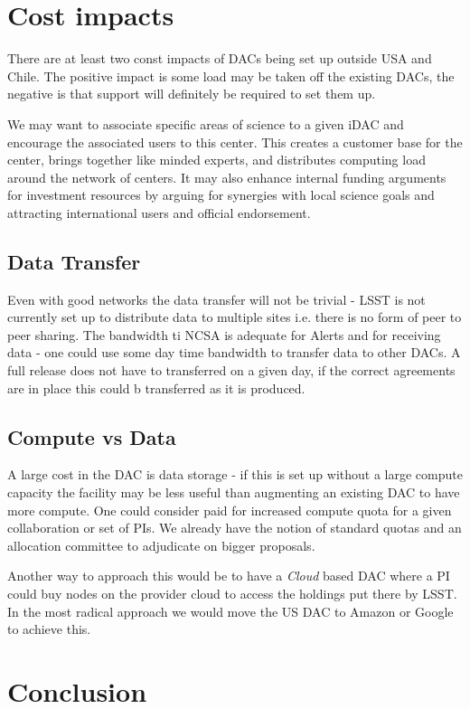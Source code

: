 \section{Cost impacts}
There are at least two const impacts of DACs being set up outside USA and Chile. The positive impact is some load may be taken off the existing DACs, the negative is that support will definitely be required to set them up.

We may want to associate specific areas of science to a given iDAC  and encourage the associated users to this center. This creates a customer base for the center, brings together like minded experts, and distributes computing load around the network of centers. It may also enhance internal funding arguments for investment resources by arguing for synergies with local science goals and attracting international users and official endorsement.


\subsection{Data Transfer}
Even with good networks the data transfer will not be trivial - LSST is not currently set up to distribute data to multiple sites i.e. there is no form of peer to peer sharing. The bandwidth ti NCSA is adequate for Alerts and for receiving data - one could use some day time bandwidth to transfer data to other DACs. A full release does not have to transferred on a given day, if the correct agreements are in place this could b transferred as it is produced.

\subsection{Compute vs Data}
A large cost in the DAC is data storage - if this is set up without a large compute capacity the facility may be less useful  than augmenting an existing DAC to have more compute. One could consider paid for increased compute quota for a given collaboration or set of PIs.
We already have the notion of standard quotas and an allocation committee to adjudicate on bigger proposals.

Another way to approach this would be to have a \emph{Cloud} based DAC where a PI could buy nodes on the provider cloud to access the holdings put there by LSST. In the most radical approach we would move the US DAC to Amazon or Google to achieve this.


\section{Conclusion}
